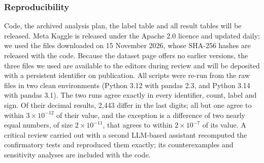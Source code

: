 \documentclass[10pt]{article}
\begin{document}
\subsubsection*{Reproducibility}
Code, the archived analysis plan, the label table and all result tables will be released. Meta Kaggle is released under the Apache 2.0 licence and updated daily; we used the files downloaded on 15 November 2026, whose SHA-256 hashes are released with the code. Because the dataset page offers no earlier versions, the three files we used are available to the editors during review and will be deposited with a persistent identifier on publication. All scripts were re-run from the raw files in two clean environments (Python 3.12 with pandas 2.3, and Python 3.14 with pandas 3.1). The two runs agree exactly in every identifier, count, label and sign. Of their decimal results, 2,443 differ in the last digits; all but one agree to within $3\times10^{-12}$ of their value, and the exception is a difference of two nearly equal numbers, of size $2\times10^{-11}$, that agrees to within $2\times10^{-7}$ of its value. A critical review carried out with a second LLM-based assistant recomputed the confirmatory tests and reproduced them exactly; its counterexamples and sensitivity analyses are included with the code.




\appendix

\end{document}
